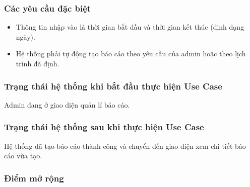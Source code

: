 \subsubsection{Các yêu cầu đặc biệt}
\begin{itemize}
  \item Thông tin nhập vào là thời gian bắt đầu và thời gian kết thúc (định dạng ngày).
  \item Hệ thống phải tự động tạo báo cáo theo yêu cầu của admin hoặc theo lịch trình đã định.
\end{itemize}

\subsubsection{Trạng thái hệ thống khi bắt đầu thực hiện Use Case}
Admin đang ở giao diện quản lí báo cáo.

\subsubsection{Trạng thái hệ thống sau khi thực hiện Use Case}
Hệ thống đã tạo báo cáo thành công và chuyển đến giao diện xem chi tiết báo cáo vừa tạo.

\subsubsection{Điểm mở rộng}